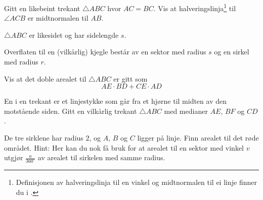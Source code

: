 Gitt en likebeint trekant $\triangle {ABC} $ hvor $ AC=BC $. Vis at halveringslinja\footnote{Definisjonen av halveringslinja til en vinkel og midtnormalen til ei linje finner du i \tmen.} til $ \angle ACB $ er midtnormalen til $ AB $.

$ \triangle ABC $ er likesidet og har sidelengde $ s $. 



\newpage
{}
Overflaten til en (vilkårlig) kjegle består av en sektor med radius $ s $ og en sirkel med radius $ r $.




Vis at det doble arealet til $ \triangle ABC $ er gitt som
\[ AE\cdot BD + CE\cdot AD \]


En  i en trekant er et linjestykke som går fra et hjørne til midten av den motstående siden. 
Gitt en vilkårlig trekant $ \triangle ABC $ med medianer $ AE $, $ BF $ og  $ CD $. 

\newpage
{}
De tre sirklene har radius $ 2 $, og $ A $, $ B $ og $ C $ ligger på linje.
Finn arealet til det røde området.
{\footnotesize Hint: Her kan du nok få bruk for at arealet til en sektor med vinkel $ v $ utgjør $ \frac{a}{360^\circ} $ av arealet til sirkelen med samme radius.}


